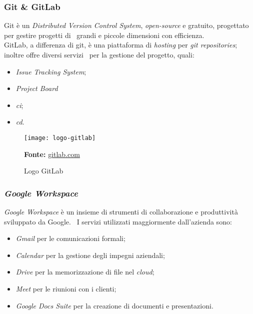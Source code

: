 \subsubsection{Git \& GitLab}
Git è un \emph{Distributed Version Control System}, \emph{open-source} e gratuito, progettato per gestire progetti di \
grandi e piccole dimensioni con efficienza. \\

GitLab, a differenza di git, è una piattaforma di \emph{hosting} per \emph{git repositories}; inoltre offre diversi servizi \
per la gestione del progetto, quali:

\begin{itemize}
  \item \emph{Issue Tracking System};
  \item \emph{Project Board}
  \item \emph{\acrfull{ci}};
  \item \emph{\acrfull{cd}}.
\end{itemize}

\vspace{20pt}
  \begin{figure}[!ht]
    \begin{center}
      \texttt{[image: logo-gitlab]}
      \caption{Logo GitLab}
      \textbf{Fonte:} \href{https://www.gitlab.com}{gitlab.com}
    \end{center}
  \end{figure}
\vspace{20pt} 

\subsubsection{\emph{Google Workspace}}
\emph{Google Workspace} è un insieme di strumenti di collaborazione e produttività sviluppato da Google. \
I servizi utilizzati maggiormente dall'azienda sono:

\begin{itemize}
  \item \emph{Gmail} per le comunicazioni formali;
  \item \emph{Calendar} per la gestione degli impegni aziendali;
  \item \emph{Drive} per la memorizzazione di file nel \emph{cloud};
  \item \emph{Meet} per le riunioni con i clienti;
  \item \emph{Google Docs Suite} per la creazione di documenti e presentazioni.
\end{itemize}

